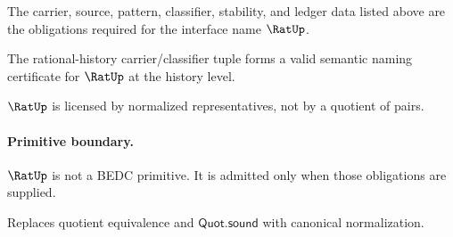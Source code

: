 \begin{definition}
\label{def:rat-certificate-obligations}
The carrier, source, pattern, classifier, stability, and ledger data listed above are the obligations required for the interface name \(\RatUp\).
\end{definition}

\begin{theorem}
\label{thm:concrete-rat-namecert}
The rational-history carrier/classifier tuple forms a valid semantic naming certificate for $\RatUp$ at the history level.
\end{theorem}

\begin{corollary}
\label{cor:rat-licensed-not-primitive}
\(\RatUp\) is licensed by normalized representatives, not by a quotient of pairs.
\end{corollary}

\paragraph{Primitive boundary.}
\(\RatUp\) is not a BEDC primitive. It is admitted only when those obligations are supplied.

\begin{remark}
\label{rem:rat-zero-axiom-note}
Replaces quotient equivalence and \(\mathsf{Quot.sound}\) with canonical normalization.
\end{remark}

